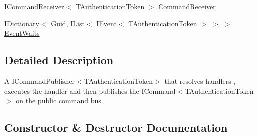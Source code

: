 \begin{DoxyCompactItemize}
\item 
\hyperlink{interfaceCqrs_1_1Commands_1_1ICommandReceiver}{I\+Command\+Receiver}$<$ T\+Authentication\+Token $>$ \hyperlink{classCqrs_1_1Akka_1_1Commands_1_1AkkaCommandBus_ac65a93dadbbb006dd815c5c54c9ecc82_ac65a93dadbbb006dd815c5c54c9ecc82}{Command\+Receiver}
\item 
I\+Dictionary$<$ Guid, I\+List$<$ \hyperlink{interfaceCqrs_1_1Events_1_1IEvent}{I\+Event}$<$ T\+Authentication\+Token $>$ $>$ $>$ \hyperlink{classCqrs_1_1Akka_1_1Commands_1_1AkkaCommandBus_af64744500f25a0b203684ef757aa7962_af64744500f25a0b203684ef757aa7962}{Event\+Waits}
\end{DoxyCompactItemize}


\subsection{Detailed Description}
A I\+Command\+Publisher$<$\+T\+Authentication\+Token$>$ that resolves handlers , executes the handler and then publishes the I\+Command$<$\+T\+Authentication\+Token$>$ on the public command bus. 



\subsection{Constructor \& Destructor Documentation}
\mbox{\label{classCqrs_1_1Akka_1_1Commands_1_1AkkaCommandBus_a765b65e299cc1b32c4c0e7ee405c473d_a765b65e299cc1b32c4c0e7ee405c473d}} 
